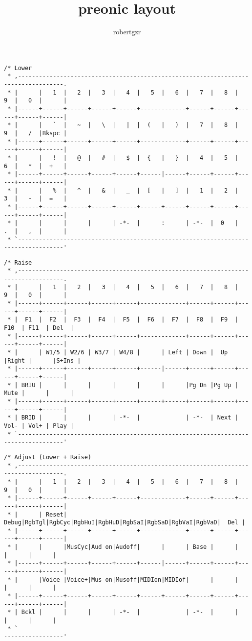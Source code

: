\documentclass[12pt,a4paper]{report}
\title{preonic layout}
\author{robertgzr}
\begin{document}
\begin{verbatim}
/* Lower
 * ,-----------------------------------------------------------------------------------.
 * |      |   1  |   2  |   3  |   4  |   5  |   6  |   7  |   8  |   9  |   0  |      |
 * |------+------+------+------+------+-------------+------+------+------+------+------|
 * |      |   `  |   ~  |   \  |   |  |  (   |   )  |   7  |   8  |   9  |   /  |Bkspc |
 * |------+------+------+------+------+-------------+------+------+------+------+------|
 * |      |   !  |   @  |   #  |   $  |  {   |   }  |   4  |   5  |   6  |   *  |  +   |
 * |------+------+------+------+------+------|------+------+------+------+------+------|
 * |      |   %  |   ^  |   &  |   _  |  [   |   ]  |   1  |   2  |   3  |   -  |  =   |
 * |------+------+------+------+------+------+------+------+------+------+------+------|
 * |      |      |      |      | -*-  |      :      | -*-  |  0   |   .  |   ,  |      |
 * `-----------------------------------------------------------------------------------'
\end{verbatim}

\begin{verbatim}
/* Raise
 * ,-----------------------------------------------------------------------------------.
 * |      |   1  |   2  |   3  |   4  |   5  |   6  |   7  |   8  |   9  |   0  |      |
 * |------+------+------+------+------+-------------+------+------+------+------+------|
 * |  F1  |  F2  |  F3  |  F4  |  F5  |  F6  |  F7  |  F8  |  F9  | F10  | F11  | Del  |
 * |------+------+------+------+------+-------------+------+------+------+------+------|
 * |      | W1/5 | W2/6 | W3/7 | W4/8 |      | Left | Down |  Up  |Right |      |S+Ins |
 * |------+------+------+------+------+------|------+------+------+------+------+------|
 * | BRIU |      |      |      |      |      |      |Pg Dn |Pg Up | Mute |      |      |
 * |------+------+------+------+------+------+------+------+------+------+------+------|
 * | BRID |      |      |      | -*-  |             | -*-  | Next | Vol- | Vol+ | Play |
 * `-----------------------------------------------------------------------------------'
\end{verbatim}

\begin{verbatim}
/* Adjust (Lower + Raise)
 * ,-----------------------------------------------------------------------------------.
 * |      |   1  |   2  |   3  |   4  |   5  |   6  |   7  |   8  |   9  |   0  |      |
 * |------+------+------+------+------+-------------+------+------+------+------+------|
 * |      | Reset| Debug|RgbTgl|RgbCyc|RgbHuI|RgbHuD|RgbSaI|RgbSaD|RgbVaI|RgbVaD|  Del |
 * |------+------+------+------+------+-------------+------+------+------+------+------|
 * |      |      |MusCyc|Aud on|Audoff|      |      | Base |      |      |      |      |
 * |------+------+------+------+------+------|------+------+------+------+------+------|
 * |      |Voice-|Voice+|Mus on|Musoff|MIDIon|MIDIof|      |      |      |      |      |
 * |------+------+------+------+------+------+------+------+------+------+------+------|
 * | Bckl |      |      |      | -*-  |             | -*-  |      |      |      |      |
 * `-----------------------------------------------------------------------------------'
\end{verbatim}
\end{document}
